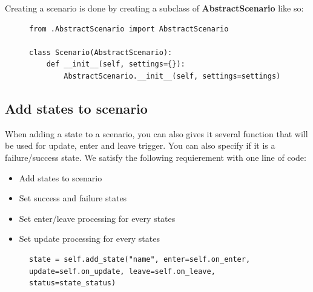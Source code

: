 \documentclass[12pt]{article}
\theoremstyle{definition}
\theoremstyle{definition}
\theoremstyle{remark}
\begin{document}
Creating a scenario is done by creating a subclass of \textbf{AbstractScenario} like so:

\begin{figure}[H]
    \begin{lstlisting}[caption="Creating a scenario",label={lst:python-create-scenario}]
from .AbstractScenario import AbstractScenario

class Scenario(AbstractScenario):
    def __init__(self, settings={}):
        AbstractScenario.__init__(self, settings=settings)
    \end{lstlisting}
\end{figure}


\subsection{Add states to scenario}

When adding a state to a scenario, you can also gives it several function that will be used for update, enter and leave trigger. You can also specify if it is a failure/success state. We satisfy the following requierement with one line of code:
\begin{itemize}
\item Add states to scenario
\item Set success and failure states
\item Set enter/leave processing for every states
\item Set update processing for every states
\end{itemize}

\begin{figure}[H]
    \begin{lstlisting}[caption="Add states",label={lst:python-add-state}]
state = self.add_state("name", enter=self.on_enter, update=self.on_update, leave=self.on_leave, status=state_status)
    \end{lstlisting}
\end{figure}
\end{document}
